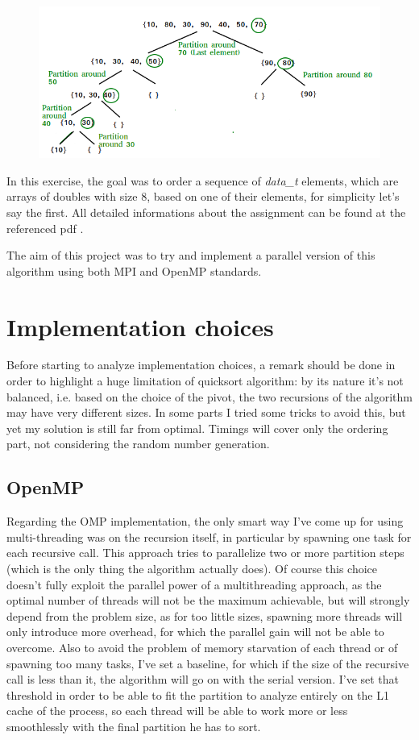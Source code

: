 \documentclass{article}
\begin{document}
	\begin{figure}[h]
		\centering
		\includegraphics[width=0.7\linewidth]{QuickSort2}
		\caption[Illustration of Quicksort algorithm]{}
		\label{fig:quicksort2}
	\end{figure}
	
	
	In this exercise, the goal was to order a sequence of \textit{data\_t} elements, which are arrays of doubles with size 8, based on one of their elements, for simplicity let's say the first. All detailed informations about the assignment can be found at the referenced pdf \cite{ex2}.
	
	The aim of this project was to try and implement a parallel version of this algorithm using both MPI and OpenMP standards.
	
	\section{Implementation choices}
	Before starting to analyze implementation choices, a remark should be done in order to highlight a huge limitation of quicksort algorithm: by its nature it's not balanced, i.e. based on the choice of the pivot, the two recursions of the algorithm may have very different sizes. In some parts I tried some tricks to avoid this, but yet my solution is still far from optimal.
	Timings will cover only the ordering part, not considering the random number generation.
	
	\subsection{OpenMP}
	Regarding the OMP implementation, the only smart way I've come up for using multi-threading was on the recursion itself, in particular by spawning one task for each recursive call. This approach tries to parallelize two or more partition steps (which is the only thing the algorithm actually does). Of course this choice doesn't fully exploit the parallel power of a multithreading approach, as the optimal number of threads will not be the maximum achievable, but will strongly depend from the problem size, as for too little sizes, spawning more threads will only introduce more overhead, for which the parallel gain will not be able to overcome.
	Also to avoid the problem of memory starvation of each thread or of spawning too many tasks, I've set a baseline, for which if the size of the recursive call is less than it, the algorithm will go on with the serial version. I've set that threshold in order to be able to fit the partition to analyze entirely on the L1 cache of the process, so each thread will be able to work more or less smoothlessly with the final partition he has to sort.
	
\end{document}
